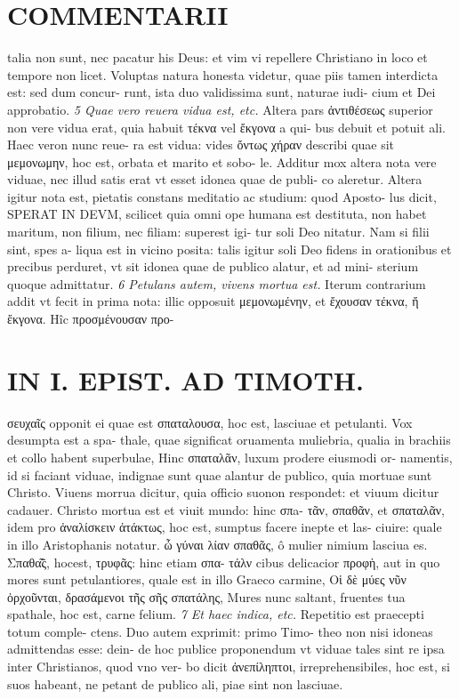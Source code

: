 \documentclass{article}
\begin{document}
\begin{pages}
\section*{COMMENTARII }
\marginpar{[ p.124 ]}\pstart talia non sunt, nec pacatur his Deus: et vim vi repellere Christiano in loco et tempore non licet. Voluptas natura honesta videtur, quae piis tamen interdicta est: sed dum concur- runt, ista duo validissima sunt, naturae iudi- cium et Dei approbatio.  \pend
\textit{5 Quae vero reuera vidua est, etc. }\pstart Altera pars ἀντιθέσεως superior non vere vidua erat, quia habuit τέκνα vel ἔκγονα a qui- bus debuit et potuit ali. Haec veron nunc reue- ra est vidua: vides ὄντως χήραν describi quae sit μεμονωμην, hoc est, orbata et marito et sobo- le. Additur mox altera nota vere viduae, nec illud satis erat vt esset idonea quae de publi- co aleretur. Altera igitur nota est, pietatis constans meditatio ac studium: quod Aposto- lus dicit, SPERAT IN DEVM, scilicet quia omni ope humana est destituta, non habet maritum, non filium, nec filiam: superest igi- tur soli Deo nitatur. Nam si filii sint, spes a- liqua est in vicino posita: talis igitur soli Deo fidens in orationibus et precibus perduret, vt sit idonea quae de publico alatur, et ad mini- sterium quoque admittatur.  \pend
\textit{6 Petulans autem, vivens mortua est. }\pstart Iterum contrarium addit vt fecit in prima nota: illic opposuit μεμονωμένην, et ἔχουσαν τέκνα, ἤ ἔκγονα.  Hîc προσμένουσαν προ-  \pend
\section*{IN I. EPIST. AD TIMOTH. }
\marginpar{[ p.125 ]}\pstart σευχαῖς opponit ei quae est σπαταλουσα, hoc est, lasciuae et petulanti. Vox desumpta est a spa- thale, quae significat oruamenta muliebria, qualia in brachiis et collo habent superbulae, Hinc σπαταλᾶν, luxum prodere eiusmodi or- namentis, id si faciant viduae, indignae sunt quae alantur de publico, quia mortuae sunt Christo. Viuens morrua dicitur, quia officio suonon respondet: et viuum dicitur cadauer. Christo mortua est et viuit mundo: hinc σπa- τᾶν, σπαθᾶν, et σπαταλᾶν, idem pro ἀναλίσκειν ἀτάκτως, hoc est, sumptus facere inepte et las- ciuire: quale in illo Aristophanis notatur. ὦ γύναι λίαν σπαθᾶς, ô mulier nimium lasciua es. Σπαθα̃͂ς, hocest, τρυφᾶς: hinc etiam σπα- τάλν cibus delicacior προφὴ, aut in quo mores sunt petulantiores, quale est in illo Graeco carmine, Οἱ δὲ μύες νῦν ὀρχοῦνται, δρασάμενοι τῆς σῆς σπατάλης, Mures nunc saltant, fruentes tua spathale, hoc est, carne felium.  \pend
\textit{7 Et haec indica, etc. }\pstart Repetitio est praecepti totum comple- ctens. Duo autem exprimit: primo Timo- theo non nisi idoneas admittendas esse: dein- de hoc publice proponendum vt viduae tales sint re ipsa inter Christianos, quod vno ver- bo dicit ἀνεπίληπτοι, irreprehensibiles, hoc est, si suos habeant, ne petant de publico ali, piae sint non lasciuae.  \pend

\end{pages}
\end{document}
